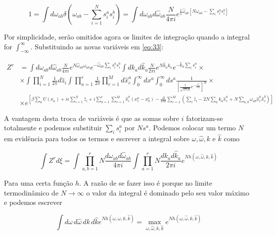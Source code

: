 \begin{equation}
  \label{eq:37}
  1 = \int d\omega_{ab} \delta\left(\omega_{ab} -
    \sum_{i=1}^N s_i^a s_i^b\right) = \int d\omega_{ab}
  d\hat{\omega}_{ab} \frac{N}{4\pi i} e^{\frac{1}{2}\hat{\omega}_{ab} [N \omega_{ab} - \sum_i
      s_i^a s_i^b]}
\end{equation}

Por simplicidade, serão omitidos agora os limites de integração quando
a integral for $\int_{-\infty}^\infty$. Substituindo as novas
variáveis em \eqref{eq:33}:

\begin{align}
  \label{eq:33}
 Z^r  & =  \int d\omega_{ab}
  d\hat{\omega}_{ab} \frac{N}{4\pi i} e^{N \hat{\omega}_{ab}
    \omega_{ab}} e^{ - \hat{\omega}_{ab}\sum_i
      s_i^a s_i^b} \int dk_{a}
  d\hat{k}_{a} \frac{N}{2\pi i} e^{N \hat{k}_{a}
    k_{a}} e^{ - \hat{k}_{a}\sum_i
      s_i^a} \times \nonumber \\ 
    &\times \int \prod_{i=1}^N 
  \frac{1}{2\pi} d\hat{z}_i \int \prod_{a=1}^r
  \frac{1}{2\pi} \prod_{c=1}^M d\hat{x}_c^a \int_0^{\infty} d x^a
  \int_0^\infty ds^a \frac{1}{\left[\frac{1}{\sqrt{2\pi\Delta}}
      e^{-\frac{\epsilon^2}{2\Delta}}\right]^N}  \times \\ 
  & \times e^{\left[\beta \sum_a U(x_a) + i\epsilon\sum_{i=1}^N \hat{z}_i + i\sum_{a=1}^r \sum_{c=1}^M
    \hat{x}_c^a \left(x_c^a - x_0^c\right) -
    \frac{\Delta}{2M} \sum_{c=1}^M \left(\sum_i \hat{z}_i - 2N\sum_a
      k_a \hat{x}^a_c + N \sum_{a,b} \omega_{ab}\hat{x}_c^a
      \hat{x}_c^b\right)\right]} \nonumber
\end{align}

A vantagem desta troca de variáveis é que as somas sobre $i$
fatorizam-se totalmente e podemos substituir $\sum_i s_i^a$ por $N
s^a$. Podemos colocar um termo $N$ em evidência para todos os termos e
escrever a integral sobre $\omega, \hat{\omega}, k$ e $\hat{k}$ como

\begin{equation}
  \label{eq:38}
  \int Z^r d\xi = \int\prod_{a,b=1}^r N
  \frac{d\omega_{ab} d\hat{\omega}_{ab}}{4\pi i} \int \prod_{a=1}^r N
  \frac{dk_{a} d\hat{k}_{a}}{2\pi i} e^{N h(\omega, \hat{\omega}, k, \hat{k})}
\end{equation}

Para uma certa função $h$. A razão de se fazer isso é porque no limite
termodinâmico de $N\to \infty$ o valor da integral é dominado pelo seu
valor máximo e podemos escrever

\begin{equation}
  \label{eq:39}
  \int d\omega \, d\hat{\omega}\, dk \, d\hat{k} e^{N h(\omega, \hat{\omega},
    k, \hat{k})} = \max_{\omega, \hat{\omega}, k, \hat{k}} e^{N h(\omega, \hat{\omega},
    k, \hat{k})}
\end{equation}

